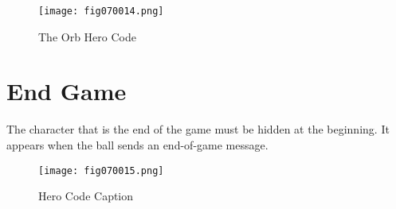 \begin{figure}[H]
   \centering
   \texttt{[image: fig070014.png]}
   \caption{The Orb Hero Code}
\label{fig070014}
\end{figure}

\section{End Game}
The character that is the end of the game must be hidden at the beginning. It appears when the ball sends an end-of-game message.

\begin{figure}[H]
   \centering
   \texttt{[image: fig070015.png]}
   \caption{Hero Code Caption}
\label{fig070015}
\end{figure}
